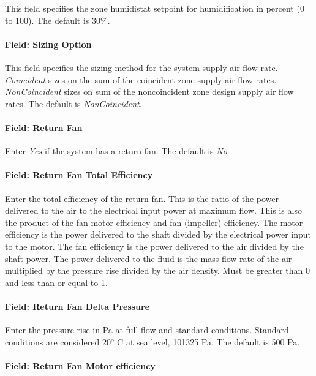 This field specifies the zone humidistat setpoint for humidification in percent (0 to 100). The default is 30\%.

\paragraph{Field: Sizing Option}\label{field-sizing-option-2}

This field specifies the sizing method for the system supply air flow rate. \emph{Coincident} sizes on the sum of the coincident zone supply air flow rates. \emph{NonCoincident} sizes on sum of the noncoincident zone design supply air flow rates. The default is \emph{NonCoincident}.

\paragraph{Field: Return Fan}\label{field-return-fan-2}

Enter \emph{Yes} if the system has a return fan. The default is \emph{No}.

\paragraph{Field: Return Fan Total Efficiency}\label{field-return-fan-total-efficiency-2}

Enter the total efficiency of the return fan. This is the ratio of the power delivered to the air to the electrical input power at maximum flow. This is also the product of the fan motor efficiency and fan (impeller) efficiency. The motor efficiency is the power delivered to the shaft divided by the electrical power input to the motor. The fan efficiency is the power delivered to the air divided by the shaft power. The power delivered to the fluid is the mass flow rate of the air multiplied by the pressure rise divided by the air density. Must be greater than 0 and less than or equal to 1.

\paragraph{Field: Return Fan Delta Pressure}\label{field-return-fan-delta-pressure-4}

Enter the pressure rise in Pa at full flow and standard conditions. Standard conditions are considered 20\(^{o}\) C at sea level, 101325 Pa. The default is 500 Pa.

\paragraph{Field: Return Fan Motor efficiency}\label{field-return-fan-motor-efficiency-4}

